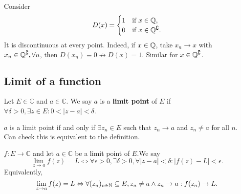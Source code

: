 \begin{example}
    Consider 
    \[
        D(x) = \begin{cases}
        1 &\text{if }x\in \mathbb{Q}, \\
        0 &\text{if }x\in {\mathbb{Q}}^\complement.\\
        \end{cases} 
    \]
    It is discontinuous at every point. Indeed, if $x\in {\mathbb{Q}}$, take $x_n\to x$ with $ x_n\in {\mathbb{Q}}^\complement,\forall n $, then $ D(x_n)\equiv 0 \nrightarrow D(x)=1 $. Similar for $ x\in {\mathbb{Q}}^\complement $.
\end{example}

\subsection{Limit of a function}
\begin{definition}
    Let $ E\in \mathbb{C} $ and $ a\in \mathbb{C} $. We say $a$ is a \textbf{limit point} of $E$ if $ \forall \delta>0, \exists z\in E: 0<\left| z-a \right| <\delta $.
    \begin{center}
    \end{center}
\end{definition}
\begin{remark}
    $a$ is a limit point if and only if $ \exists z_n\in E $ such that $ z_n\to a $ and $ z_n\neq a $ for all $n$. Can check this is equivalent to the definition.
\end{remark}

\begin{definition}
    $ f:E\to \mathbb{C} $ and let $ a\in \mathbb{C} $ be a limit point of $E$.We say 
    \[
        \lim_{z \to a} f(z) = L \Longleftrightarrow \forall \epsilon>0, \exists \delta>0, \forall \left| z-a \right| <\delta: \left| f(z)-L \right|< \epsilon.
    \]
    Equivalently,
    \[
        \lim_{z \to a} f(z)=L \Leftrightarrow \forall (z_n)_{n\in{\mathbb{N}}} \subseteq E, z_n\neq a \land z_n\to a: f(z_n)\to L.
    \]
\end{definition}


